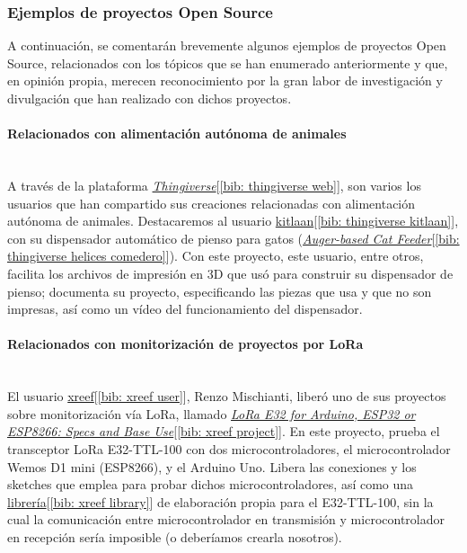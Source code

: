 \documentclass[12pt]{article}
\newcommand{\subsubsubsection}[1]{\paragraph{#1}\mbox{}\\}
\begin{document}
	\subsubsection{Ejemplos de proyectos Open Source}
	
	\noindent A continuación, se comentarán brevemente algunos ejemplos de proyectos Open Source, relacionados con los tópicos que se han enumerado anteriormente y que, en opinión propia, merecen reconocimiento por la gran labor de investigación y divulgación que han realizado con dichos proyectos. 
	
	\subsubsubsection{Relacionados con alimentación autónoma de animales}
	
	\noindent A través de la plataforma \href{https://www.thingiverse.com/}{\textit{Thingiverse}}[\ref{bib: thingiverse web}], son varios los usuarios que han compartido sus creaciones relacionadas con alimentación autónoma de animales. Destacaremos al usuario \href{https://www.thingiverse.com/kitlaan/designs}{kitlaan}[\ref{bib: thingiverse kitlaan}], con su dispensador automático de pienso para gatos (\href{https://www.thingiverse.com/thing:27854}{\textit{Auger-based Cat Feeder}}[\ref{bib: thingiverse helices comedero}]). Con este proyecto, este usuario, entre otros, facilita los archivos de impresión en 3D que usó para construir su dispensador de pienso; documenta su proyecto, especificando las piezas que usa y que no son impresas, así como un vídeo del funcionamiento del dispensador.
	
	\subsubsubsection{Relacionados con monitorización de proyectos por LoRa}
	
	\noindent El usuario \href{https://create.arduino.cc/projecthub/xreef}{xreef}[\ref{bib: xreef user}], Renzo Mischianti, liberó uno de sus proyectos sobre monitorización vía LoRa, llamado \href{https://create.arduino.cc/projecthub/xreef/lora-e32-for-arduino-esp32-or-esp8266-specs-and-base-use-804d25}{\textit{LoRa E32 for Arduino, ESP32 or ESP8266: Specs and Base Use}}[\ref{bib: xreef project}]. En este proyecto, prueba el transceptor LoRa E32-TTL-100 con dos microcontroladores, el microcontrolador Wemos D1 mini (ESP8266), y el Arduino Uno. Libera las conexiones y los sketches que emplea para probar dichos microcontroladores, así como una \href{https://github.com/xreef/LoRa_E32_Series_Library}{librería}[\ref{bib: xreef library}] de elaboración propia para el E32-TTL-100, sin la cual la comunicación entre microcontrolador en transmisión y microcontrolador en recepción sería imposible (o deberíamos crearla nosotros).
	
\end{document}
